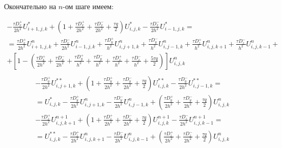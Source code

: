 \documentclass[a4paper,12pt]{article}
\begin{document}
Окончательно на $n$-ом шаге имеем:

\begin{multline}
  - \frac{\tau D^+_x}{2h^2} U^{*}_{i+1,j,k} + \left( 1 + \frac{\tau D^+_x}{2h^2} + \frac{\tau D^-_x}{2h^2} + \frac{\tau q}{2} \right) U^{*}_{i,j,k} - \frac{\tau D^-_x}{2 h^2} U^{*}_{i-1,j,k} = \\
  = \frac{\tau D^+_x}{2h^2} U^n_{i+1,j,k} + \frac{\tau D^-_x}{2h^2} U^n_{i-1,j,k} + \frac{\tau D^+_y}{h^2} U^n_{i,j+1,k} + \frac{\tau D^-_y}{h^2} U^n_{i,j-1,k} + \frac{\tau D^+_z}{h^2} U^n_{i,j,k+1} + \frac{\tau D^-_z}{h^2} U^n_{i,j,k-1} + \\
  + \left[ 1 - \left( \frac{\tau D^+_x}{2h^2} + \frac{\tau D^-_x}{2h^2} + \frac{\tau D^+_y}{h^2} + \frac{\tau D^-_y}{h^2} + \frac{\tau D^+_z}{h^2} + \frac{\tau D^-_z}{h^2} + \frac{5 \tau q}{2} \right) \right] U^n_{i,j,k} \\
\end{multline}
\begin{multline}
  - \frac{\tau D^+_y}{2h^2} U^{**}_{i,j+1,k} + \left( 1 + \frac{\tau D^+_y}{2h^2} + \frac{\tau D^-_y}{2h^2} + \frac{\tau q}{2} \right) U^{**}_{i,j,k} - \frac{\tau D^-_y}{2 h^2} U^{**}_{i,j-1,k} = \\
  = U^{*}_{i,j,k} - \frac{\tau D^+_y}{2 h^2} U^n_{i,j+1,k} - \frac{\tau D^-_y}{2 h^2} U^n_{i,j-1,k} + \left( \frac{\tau D^+_y}{2 h^2} + \frac{\tau D^-_y}{2 h^2} + \frac{\tau q}{2}  \right) U^n_{i,j,k}
\end{multline}
\begin{multline}
  - \frac{\tau D^+_z}{2h^2} U^{n+1}_{i,j,k+1} + \left( 1 + \frac{\tau D^+_z}{2h^2} + \frac{\tau D^-_z}{2h^2} + \frac{\tau q}{2} \right) U^{n+1}_{i,j,k} - \frac{\tau D^-_z}{2 h^2} U^{n+1}_{i,j,k-1} = \\
  = U^{**}_{i,j,k} - \frac{\tau D^+_z}{2h^2} U^n_{i,j,k+1} - \frac{\tau D^-_z}{2h^2} U^n_{i,j,k-1} + \left(\frac{\tau D^+_z}{2h^2} +\frac{\tau D^-_z}{2h^2} + \frac{\tau q}{2} \right) U^n_{i,j,k}
\end{multline}
\end{document}
